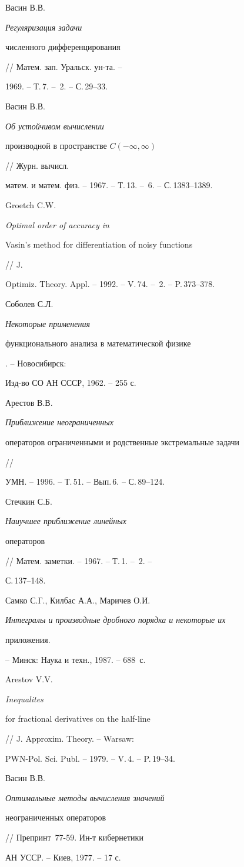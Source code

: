 \begin{thebibliography}{9}





 Васин В.В. {\it Регуляризация задачи


численного дифференцирования} // Матем. зап. Уральск. ун-та. --


1969. -- Т.\,7. -- \No\,2. -- С.\,29--33.


 Васин В.В. {\it Об устойчивом вычислении


производной в пространстве $C(-\infty,\infty)$} // Журн. вычисл.


матем. и матем. физ. -- 1967. -- Т.\,13. -- \No\,6. -- С.\,1383--1389.


 Groetch C.W. {\it Optimal order of accuracy in


Vasin's method for differentiation of noisy functions} // J.


Optimiz. Theory. Appl. -- 1992. -- V.\,74. -- \No\,2. -- P.\,373--378.


 Соболев С.Л. {\it Некоторые применения


функционального анализа в математической физике}. -- Новосибирск:


Изд-во СО АН СССР, 1962. -- 255 с.


 Арестов В.В. {\it Приближение неограниченных


операторов ограниченными и родственные экстремальные задачи} //


УМН. -- 1996. -- Т.\,51. -- Вып.\,6. -- С.\,89--124.


 Стечкин С.Б. {\it Наиучшее приближение линейных


операторов} // Матем. заметки. -- 1967. -- Т.\,1. -- \No\,2. --


С.\,137--148.


 Самко С.Г., Килбас А.А., Маричев О.И.


{\it Интегралы и производные дробного порядка и некоторые их


приложения.} -- Минск: Наука и техн., 1987. -- 688~с.


 Arestov V.V. {\it Inequalites


for fractional derivatives on the half-line} // J. Approxim. Theory. -- Warsaw:


PWN-Pol. Sci. Publ. -- 1979. -- V.\,4. -- P.\,19--34.


 Васин В.В. {\it Оптимальные методы вычисления значений


неограниченных операторов} // Препринт \No\,77-59. Ин-т кибернетики 


АН УССР. -- Киев, 1977. -- 17 с.





\end{thebibliography}





\vskip 2cm












\label{end}





